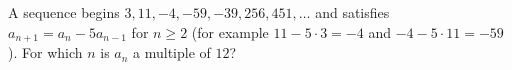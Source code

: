A sequence begins $3,11,-4,-59,-39,256,451,\dots$ and satisfies $a_{n+1}=a_n-5a_{n-1}$ for $n\ge2$ (for example $11-5\cdot3=-4$ and $-4-5\cdot11=-59$). For which $n$ is $a_n$ a multiple of $12$?
